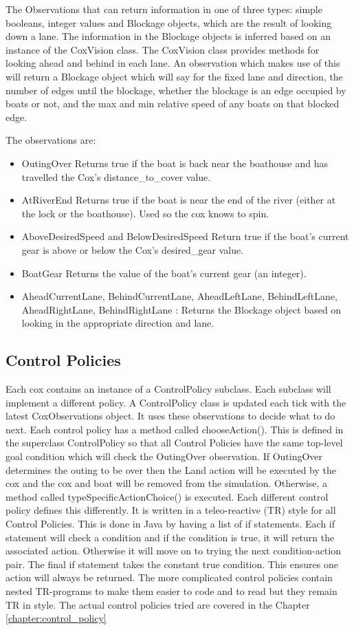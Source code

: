 The Observations that can return information in one of three types: simple booleans, integer values and Blockage objects, which are the result of looking down a lane. The information in the Blockage objects is inferred based on an instance of the CoxVision class. The CoxVision class provides methods for looking ahead and behind in each lane. An observation which makes use of this will return a Blockage object which will say for the fixed lane and direction, the number of edges until the blockage, whether the blockage is an edge occupied by boats or not, and the max and min relative speed of any boats on that blocked edge.

The observations are:
  \begin{itemize}
    \item{OutingOver} Returns true if the boat is back near the boathouse and has travelled the Cox's distance\_to\_cover value.
    \item{AtRiverEnd} Returns true if the boat is near the end of the river (either at the lock or the boathouse). Used so the cox knows to spin.
    \item{AboveDesiredSpeed and BelowDesiredSpeed} Return true if the boat's current gear is above or below the Cox's desired\_gear value. 
    \item{BoatGear} Returns the value of the boat's current gear (an integer).
    \item{AheadCurrentLane, BehindCurrentLane, AheadLeftLane, BehindLeftLane, AheadRightLane, BehindRightLane} : Returns the Blockage object based on looking in the appropriate direction and lane.
  \end{itemize}
  
\subsection{Control Policies}
  Each cox contains an instance of a ControlPolicy subclass. Each subclass will implement a different policy. A ControlPolicy class is updated each tick with the latest CoxObservations object. It uses these observations to decide what to do next.  Each control policy has a method called chooseAction(). This is defined in the superclass ControlPolicy so that all Control Policies have the same top-level goal condition which will check the OutingOver observation. If OutingOver determines the outing to be over then the Land action will be executed by the cox and the cox and boat will be removed from the simulation. Otherwise, a method called typeSpecificActionChoice() is executed. Each different control policy defines this differently. It is written in a teleo-reactive (TR) style for all Control Policies. This is done in Java by having a list of if statements. Each if statement will check a condition and if the condition is true, it will return the associated action. Otherwise it will move on to trying the next condition-action pair. The final if statement takes the constant true condition. This ensures one action will always be returned. The more complicated control policies contain nested TR-programs to make them easier to code and to read but they remain TR in style. The actual control policies tried are covered in the Chapter \ref{chapter:control_policy}
  
